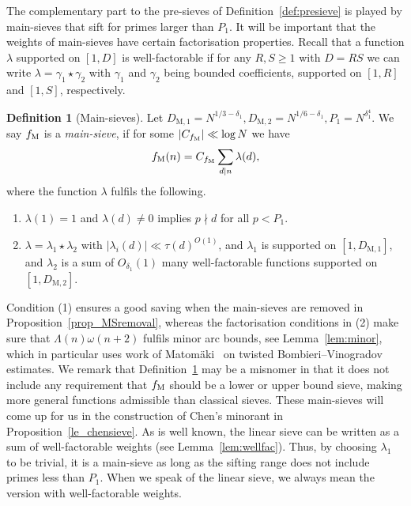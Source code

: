 \documentclass[12pt]{amsart}
\theoremstyle{definition}
\newtheorem{definition}[theorem]{Definition}
\theoremstyle{remark}
\numberwithin{equation}{section}
\newcommand{\1}{\mathbf{1}}
\begin{document}
The complementary part to the pre-sieves of Definition~\ref{def:presieve} is played by main-sieves that sift for primes larger than $P_1$. It will be important that the weights of main-sieves have certain factorisation properties. Recall that a function $\lambda$ supported on $[1,D]$ is well-factorable if for any $R,S\geq 1$ with $D=RS$ we can write $\lambda=\gamma_1 \star \gamma_2$ with $\gamma_1$ and $\gamma_2$ being bounded coefficients, supported on $[1,R]$ and $[1,S]$, respectively. 

\begin{definition}[Main-sieves] \label{def:mainsieve} Let $D_{\mathrm{M},1}=N^{1/3-\delta_1}, D_{\mathrm{M},2}=N^{1/6-\delta_1}, P_1=N^{\delta_1^4}$.
    We say $f_\textup{M}$ is a \emph{main-sieve}, if for some $|C_{f_\textup{M}}|\ll \log N$ we have
    \begin{align*}
       f_\textup{M}(n)=C_{f_\textup{M}}\sum_{d\mid n}\lambda(d),
 \end{align*}
where the function $\lambda$ fulfils the following.
\begin{enumerate}
	\item $\lambda(1)=1$ and $\lambda(d)\neq 0$ implies $p\nmid d$ for all $p < P_1$.
	\item  $\lambda=\lambda_{1}\star\lambda_{2}$ with $|\lambda_{i}(d)|\ll \tau(d)^{O(1)}$, and  $\lambda_{1}$ is supported on $[1,D_{\mathrm{M},1}]$, and $\lambda_{2}$ is a sum of $O_{\delta_1}(1)$ many well-factorable functions supported on $[1,D_{\mathrm{M},2}]$. 
\end{enumerate}
\end{definition}
 Condition (1) ensures a good saving when the main-sieves are removed in Proposition~\ref{prop_MSremoval}, whereas the factorisation conditions in (2) make sure that $\Lambda(n)\omega(n+2)$ fulfils minor arc bounds, see Lemma~\ref{lem:minor}, which in particular uses work of Matom\"aki~\cite{matomaki} on twisted Bombieri--Vinogradov estimates. We remark that Definition~\ref{def:mainsieve} may be a misnomer in that it does not include any requirement that $f_\textup{M}$ should be a lower or upper bound sieve, making more general functions admissible than classical sieves. These main-sieves will come up for us in the construction of Chen's minorant in Proposition~\ref{le_chensieve}. As is well known, the linear sieve can be written as a sum of well-factorable weights (see Lemma~\ref{lem:wellfac}). Thus, by choosing $\lambda_1$ to be trivial, it is a main-sieve as long as the sifting range does not include primes less than $P_1$. When we speak of the linear sieve, we always mean the version with well-factorable weights.
\end{document}
